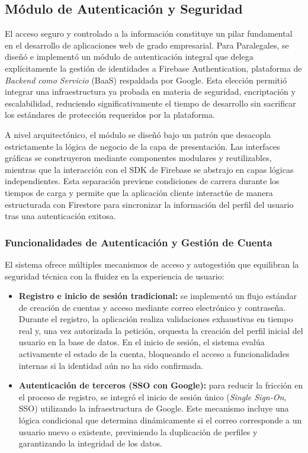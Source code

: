 \subsection{Módulo de Autenticación y Seguridad}\label{subsec:autenticacion}

El acceso seguro y controlado a la información constituye un pilar fundamental en el desarrollo de aplicaciones web de grado empresarial. Para Paralegales, se diseñó e implementó un módulo de autenticación integral que delega explícitamente la gestión de identidades a Firebase Authentication, plataforma de \textit{Backend como Servicio} (BaaS) respaldada por Google. Esta elección permitió integrar una infraestructura ya probada en materia de seguridad, encriptación y escalabilidad, reduciendo significativamente el tiempo de desarrollo sin sacrificar los estándares de protección requeridos por la plataforma.

A nivel arquitectónico, el módulo se diseñó bajo un patrón que desacopla estrictamente la lógica de negocio de la capa de presentación. Las interfaces gráficas se construyeron mediante componentes modulares y reutilizables, mientras que la interacción con el SDK de Firebase se abstrajo en capas lógicas independientes. Esta separación previene condiciones de carrera durante los tiempos de carga y permite que la aplicación cliente interactúe de manera estructurada con Firestore para sincronizar la información del perfil del usuario tras una autenticación exitosa.

\subsubsection{Funcionalidades de Autenticación y Gestión de Cuenta}

El sistema ofrece múltiples mecanismos de acceso y autogestión que equilibran la seguridad técnica con la fluidez en la experiencia de usuario:

\begin{itemize}
  \item \textbf{Registro e inicio de sesión tradicional:} se implementó un flujo estándar de creación de cuentas y acceso mediante correo electrónico y contraseña. Durante el registro, la aplicación realiza validaciones exhaustivas en tiempo real y, una vez autorizada la petición, orquesta la creación del perfil inicial del usuario en la base de datos. En el inicio de sesión, el sistema evalúa activamente el estado de la cuenta, bloqueando el acceso a funcionalidades internas si la identidad aún no ha sido confirmada.

  \item \textbf{Autenticación de terceros (SSO con Google):} para reducir la fricción en el proceso de registro, se integró el inicio de sesión único (\textit{Single Sign-On}, SSO) utilizando la infraestructura de Google. Este mecanismo incluye una lógica condicional que determina dinámicamente si el correo corresponde a un usuario nuevo o existente, previniendo la duplicación de perfiles y garantizando la integridad de los datos.
\end{itemize}

